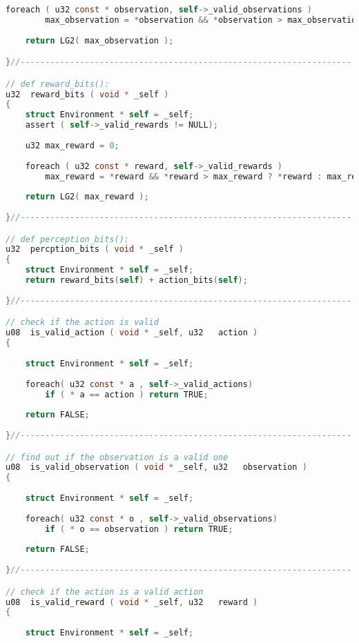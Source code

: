 \documentclass[fancychapters]{report}   	%
\begin{document}
\begin{lstlisting}[language=C,caption={environment.c}]
    foreach ( u32 const * observation, self->_valid_observations )
        max_observation = *observation && *observation > max_observation ? *observation : max_observation;
    
    return LG2( max_observation );

}//-------------------------------------------------------------------

// def reward_bits():
u32  reward_bits ( void * _self )
{
    struct Environment * self = _self;
    assert ( self->_valid_rewards != NULL);
    
    u32 max_reward = 0;
    
    foreach ( u32 const * reward, self->_valid_rewards )
        max_reward = *reward && *reward > max_reward ? *reward : max_reward;
    
    return LG2( max_reward );
    
}//-------------------------------------------------------------------

// def perception_bits():
u32  percption_bits ( void * _self )
{
    struct Environment * self = _self;
    return reward_bits(self) + action_bits(self);
    
}//-------------------------------------------------------------------

// check if the action is valid
u08  is_valid_action ( void * _self, u32   action )
{
    
    struct Environment * self = _self;
    
    foreach( u32 const * a , self->_valid_actions)
        if ( * a == action ) return TRUE;
    
    return FALSE;
    
}//-------------------------------------------------------------------

// find out if the observation is a valid one
u08  is_valid_observation ( void * _self, u32   observation )
{
    
    struct Environment * self = _self;
    
    foreach( u32 const * o , self->_valid_observations)
        if ( * o == observation ) return TRUE;
    
    return FALSE;
    
}//-------------------------------------------------------------------

// check if the action is a valid action
u08  is_valid_reward ( void * _self, u32   reward )
{
    
    struct Environment * self = _self;
    

\end{lstlisting}
\end{document}
